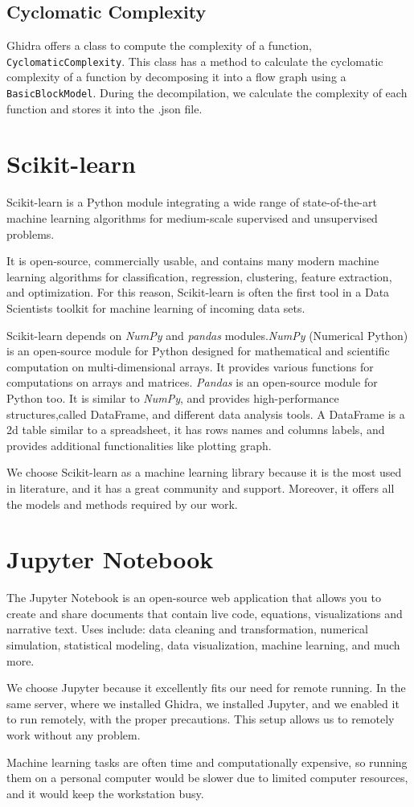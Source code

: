 \subsection{Cyclomatic Complexity}


Ghidra offers a class to compute the complexity of a function, \texttt{CyclomaticComplexity}. This class has a method to calculate the cyclomatic complexity of a function by decomposing it into a flow graph using a \texttt{BasicBlockModel}. During the decompilation, we calculate the complexity of each function and stores it into the .json file.


\section{Scikit-learn}
Scikit-learn \cite{scikit-learn} is a Python module integrating a wide range of state-of-the-art machine learning algorithms for medium-scale supervised and unsupervised problems. 

It is open-source, commercially usable, and contains many modern machine learning algorithms for classification, regression, clustering, feature extraction, and optimization. For this reason, Scikit-learn is often the first tool in a Data Scientists toolkit for machine learning of incoming data sets. 

Scikit-learn depends on \textit{NumPy} and \textit{pandas} modules.\textit{NumPy} (Numerical Python) \cite{numpypandas} is an open-source module for Python designed for mathematical and scientific computation on multi-dimensional arrays. It provides various functions for computations on arrays and matrices.
\textit{Pandas} \cite{numpypandas} is an open-source module for Python too. It is similar to \textit{NumPy}, and provides high-performance structures,called DataFrame, and different data analysis tools. A DataFrame is a 2d table similar to a spreadsheet, it has rows names and columns labels, and provides additional functionalities like plotting graph.

We choose Scikit-learn as a machine learning library because it is the most used in literature, and it has a great community and support. Moreover, it offers all the models and methods required by our work. 
\section{Jupyter Notebook}

The Jupyter Notebook  \cite{jupyter} is an open-source web application that allows you to create and share documents that contain live code, equations, visualizations and narrative text. Uses include: data cleaning and transformation, numerical simulation, statistical modeling, data visualization, machine learning, and much more.

We choose Jupyter because it excellently fits our need for remote running. In the same server, where we installed Ghidra, we installed Jupyter, and we enabled it to run remotely, with the proper precautions. This setup allows us to remotely work without any problem. 

Machine learning tasks are often time and computationally expensive, so running them on a personal computer would be slower due to limited computer resources, and it would keep the workstation busy.
